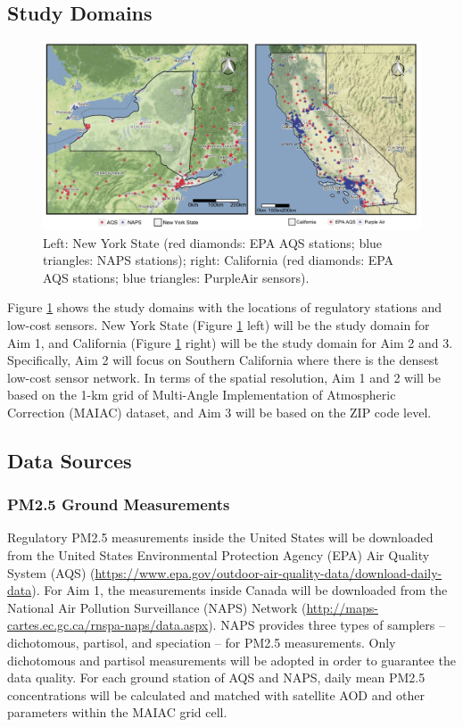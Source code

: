 \documentclass[11pt]{article}
\begin{document}
\subsection{Study Domains}

\begin{figure}[H]
\begin{center}
\includegraphics[width=\textwidth]{img/fig1.jpg}
\caption{Left: New York State (red diamonds: EPA AQS stations; blue triangles: NAPS stations); right: California (red diamonds: EPA AQS stations; blue triangles: PurpleAir sensors).}
\label{fig:domain}
\end{center}
\end{figure}

Figure \ref{fig:domain} shows the study domains with the locations of regulatory stations and low-cost sensors. New York State (Figure \ref{fig:domain} left) will be the study domain for Aim 1, and California (Figure \ref{fig:domain} right) will be the study domain for Aim 2 and 3. Specifically, Aim 2 will focus on Southern California where there is the densest low-cost sensor network. In terms of the spatial resolution, Aim 1 and 2 will be based on the 1-km grid of Multi-Angle Implementation of Atmospheric Correction (MAIAC) dataset, and Aim 3 will be based on the ZIP code level. 

\subsection{Data Sources}
\subsubsection{PM2.5 Ground Measurements}
Regulatory PM2.5 measurements inside the United States will be downloaded from the United States Environmental Protection Agency (EPA) Air Quality System (AQS) (\url{https://www.epa.gov/outdoor-air-quality-data/download-daily-data}). For Aim 1, the measurements inside Canada will be downloaded from the National Air Pollution Surveillance (NAPS) Network (\url{http://maps-cartes.ec.gc.ca/rnspa-naps/data.aspx}). NAPS provides three types of samplers -- dichotomous, partisol, and speciation -- for PM2.5 measurements. Only dichotomous and partisol measurements will be adopted in order to guarantee the data quality. For each ground station of AQS and NAPS, daily mean PM2.5 concentrations will be calculated and matched with satellite AOD and other parameters within the MAIAC grid cell.
\end{document}
